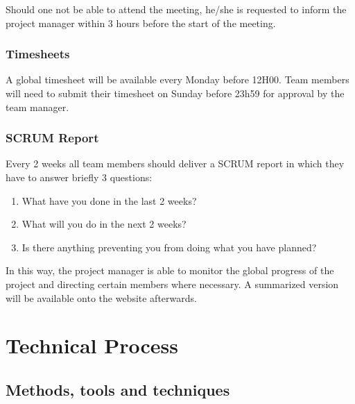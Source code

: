 \documentclass[a4paper, 12pt]{report}
\begin{document}
			Should one not be able to attend the meeting, he/she is requested to inform
			the project manager within 3 hours before the start of the meeting.
			
			\subsection{Timesheets}
			A global timesheet will be available every Monday before 12H00. Team 
			members will need to submit their timesheet on Sunday before 23h59
			for approval by the team manager.
			
			\subsection{SCRUM Report}
			Every 2 weeks all team members should deliver a SCRUM report in which they have to
			answer briefly 3 questions:
			
			\begin{enumerate}
				\item What have you done in the last 2 weeks?
				\item What will you do in the next 2 weeks?
				\item Is there anything preventing you from doing what you have
				planned?
			\end{enumerate}	
			
			In this way, the project manager is able to monitor the global progress of the project
			and directing certain members where necessary. A summarized version will be available
			onto the website afterwards. 
			
			
	\chapter{Technical Process}
	
			\section{Methods, tools and techniques}
			
\end{document}
